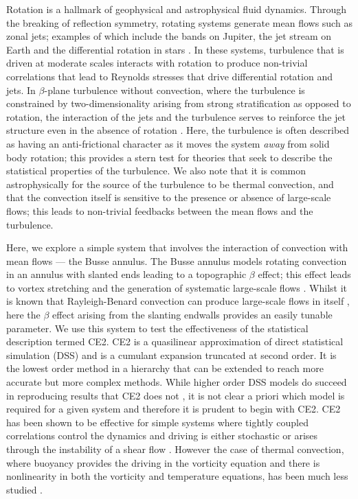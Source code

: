 \documentclass{jfm}
\begin{document}
Rotation is a hallmark of geophysical and astrophysical fluid dynamics.
Through the breaking of reflection symmetry, rotating systems generate mean flows such as zonal jets; examples of which include the bands on Jupiter, the jet stream on Earth and the differential rotation in stars \citep{galperin_read_2019}.
In these systems, turbulence that is driven at moderate scales interacts with rotation to produce non-trivial correlations that lead to Reynolds stresses that drive differential rotation and jets. In $\beta$-plane turbulence without convection, where the turbulence is constrained by two-dimensionality arising from strong stratification as opposed to rotation, the interaction of the jets and the turbulence serves to reinforce the jet structure even in the absence of rotation \citep[see][figure 25.1]{farrel_ioannou_2019}. Here, the turbulence is often described as having an anti-frictional character as it moves the system \textit{away} from solid body rotation; this provides a stern test for theories that seek to describe the statistical properties of the turbulence. We also note that it is common astrophysically for the source of the turbulence to be thermal convection, and that the convection itself is sensitive to the presence or absence of large-scale flows; this leads to non-trivial feedbacks between the mean flows and the turbulence.

Here, we explore a simple system that involves the interaction of convection with mean flows --- the Busse annulus. The Busse annulus models rotating convection in an annulus with slanted ends leading to a topographic $\beta$ effect; this effect leads to vortex stretching and the generation of systematic large-scale flows 
\citep[see e.g.][]{1976Icar...29..255B,bh1993,rj2006}. Whilst it is known that Rayleigh-Benard convection can produce large-scale flows in itself \citep[e.g.][]{1970JAtS...27.1107T,2014JFM...759..360G}, here the $\beta$ effect arising from the slanting endwalls provides an easily tunable parameter. We use this system to test the effectiveness of the statistical description termed CE2. CE2 is a quasilinear approximation of direct statistical simulation (DSS) and is a cumulant expansion truncated at second order. It is the lowest order method in a hierarchy that can be extended to reach more accurate but more complex methods. While higher order DSS models do succeed in reproducing results that CE2 does not \citep[see][for a recent review]{2022arXiv220505513M}, it is not clear a priori which model is required for a given system \citep[even for simple systems, e.g.][]{2022Chaos..32d3111L} and therefore it is prudent to begin with CE2. CE2 has been shown to be effective for simple systems where tightly coupled correlations control the dynamics and driving is either stochastic \citep[e. g.][]{2007JAtS...64.3652F, 2013PhRvL.110j4502T} or arises through the instability of a shear flow \citep[e.g.][]{2008JAtS...65.1955M}. However the case of thermal convection, where buoyancy provides the driving in the vorticity equation and there is nonlinearity in both the vorticity and temperature equations, has been much less studied \citep[though we note][studied stably stratified Boussinesq dynamics with S3T]{2018JFM...854..544F,2018JAtS...75.4201F}. 
\end{document}
